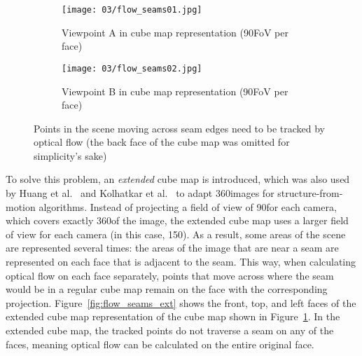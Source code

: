 \begin{figure}
\centering
    \hfill
    \begin{subfigure}[t]{0.5\textwidth}            
            \centering
            \texttt{[image: 03/flow\_seams01.jpg]}
            \caption{Viewpoint A in cube map representation (90\degree FoV per face)}
    \end{subfigure}%
    \hfill
    \begin{subfigure}[t]{0.5\textwidth}
            \centering
            \texttt{[image: 03/flow\_seams02.jpg]}
            \caption{Viewpoint B in cube map representation (90\degree FoV per face)}
    \end{subfigure}
    \hfill
    \hfill
  \caption[Points traversing seams in the cube map]{Points in the scene moving across seam edges need to be tracked by optical flow (the back face of the cube map was omitted for simplicity's sake)} \label{fig:flow_seams}
\end{figure}

To solve this problem, an \emph{extended} cube map is introduced, which was also used by Huang et al.\ \cite{6dof} and Kolhatkar et al.\ \cite{360flowblending} to adapt 360\degree images for structure-from-motion algorithms. Instead of projecting a field of view of 90\degree for each camera, which covers exactly 360\degree of the image, the extended cube map uses a larger field of view for each camera (in this case, 150\degree). As a result, some areas of the scene are represented several times: the areas of the image that are near a seam are represented on each face that is adjacent to the seam. This way, when calculating optical flow on each face separately, points that move across where the seam would be in a regular cube map remain on the face with the corresponding projection. Figure~\ref{fig:flow_seams_ext} shows the front, top, and left faces of the extended cube map representation of the cube map shown in Figure~\ref{fig:flow_seams}. In the extended cube map, the tracked points do not traverse a seam on any of the faces, meaning optical flow can be calculated on the entire original face.

